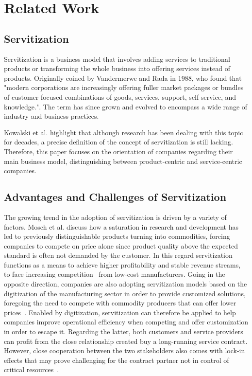 \documentclass[sigplan,screen,nonacm]{acmart}
\begin{document}
\section{Related Work}

\subsection{Servitization}
\label{sec:servitization}
Servitization is a business model that involves adding services to traditional products or transforming the whole business into offering services instead of products. Originally coined by Vandermerwe and Rada in 1988,\cite{vandermerwe1988servitization} who found that "modern corporations are increasingly offering fuller market packages or bundles of customer-focused combinations of goods, services, support, self-service, and knowledge.". The term has since grown and evolved to encompass a wide range of industry and business practices.

Kowalski et al.\cite{kowalkowski2017servitization} highlight that although research has been dealing with this topic for decades, a precise definition of the concept of servitization is still lacking. Therefore, this paper focuses on the orientation of companies regarding their main business model, distinguishing between product-centric and service-centric companies.


\subsection{Advantages and Challenges of Servitization}
The growing trend in the adoption of servitization is driven by a variety of factors. 
Mosch et al. discuss how a saturation in research and development has led to previously distinguishable products turning into commodities, forcing companies to compete on price alone since product quality above the expected standard is often not demanded by the customer\cite{mosch2021trapped}. In this regard servitization functions as a means to achieve higher profitability and stable revenue streams, to face increasing competition~\cite{eloranta2015seeking} from low-cost manufacturers. Going in the opposite direction, companies are also adopting servitization models based on the digitization of the manufacturing sector in order to provide customized solutions, foregoing the need to compete with commodity producers that can offer lower prices~\cite{mosch2021trapped}. Enabled by digitization, servitization can therefore be applied to help companies improve operational efficiency when competing and offer customization in order to escape it. Regarding the latter, both customers and service providers can profit from the close relationship created buy a long-running service contract. However, close cooperation between the two stakeholders also comes with lock-in effects that may prove challenging for the contract partner not in control of critical resources~\cite{vendrell2017servitization, mosch2021trapped, LACOSTE2015229}.
\end{document}
